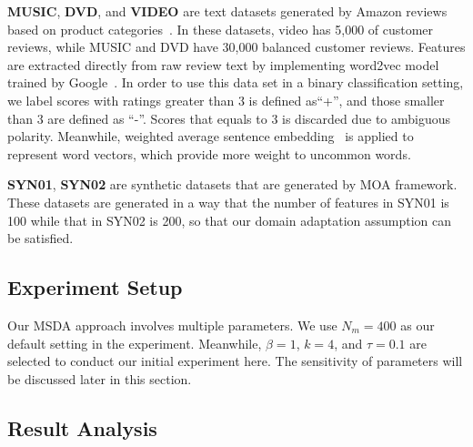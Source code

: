 \textbf{MUSIC}, \textbf{DVD}, and \textbf{VIDEO} are text datasets generated by Amazon reviews based on product categories~\cite{blitzer2007biographies}. In these datasets, video has 5,000 of customer reviews, while MUSIC and DVD have 30,000 balanced customer reviews. Features are extracted directly from raw review text by implementing word2vec model trained by Google~\cite{mikolov2013efficient}. In order to use this data set in a binary classification setting, we label scores with ratings greater than 3 is defined as``+'', and those smaller than 3 are defined as ``-''. Scores that equals to 3 is discarded due to ambiguous polarity. Meanwhile, weighted average sentence embedding~\cite{arora2016simple} is applied to represent word vectors, which provide more weight to uncommon words.

\textbf{SYN01}, \textbf{SYN02} are synthetic datasets that are generated by MOA framework. These datasets are generated in a way that the number of features in SYN01 is 100 while that in SYN02 is 200, so that our domain adaptation assumption can be satisfied.

\subsection{Experiment Setup}
Our MSDA approach involves multiple parameters. We use $N_m = 400$ as our default setting in the experiment. Meanwhile, $\beta = 1$, $k = 4$, and $\tau = 0.1$ are selected to conduct our initial experiment here. The sensitivity of parameters will be discussed later in this section.

\subsection{Result Analysis}


